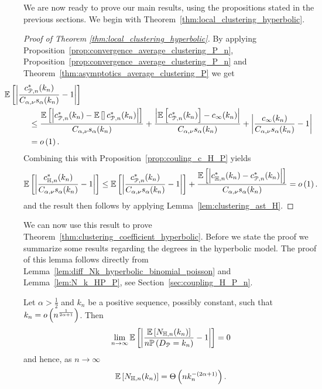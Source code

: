 We are now ready to prove our main results, using the propositions stated in the previous sections. We begin with Theorem~\ref{thm:local_clustering_hyperbolic}.

\begin{proof}[Proof of Theorem \ref{thm:local_clustering_hyperbolic}]
By applying Proposition~\ref{prop:convergence_average_clustering_P_n}, Proposition~\ref{prop:convergence_average_clustering_P_n} and Theorem~\ref{thm:asymptotics_average_clustering_P} we get
\begin{align*}
	&\hspace{-30pt}\Exp{\left|\frac{c_{\Pcal,n}^\ast(k_n)}{C_{\alpha,\nu}s_\alpha(k_n)} - 1\right|}\\
	&\le \frac{\Exp{\left|c_{\Pcal,n}^\ast(k_n) - \Exp{}c_{\Pcal,n}^\ast(k_n)\right|}}{C_{\alpha,\nu}s_\alpha(k_n)}
		+ \frac{\left|\Exp{c_{\Pcal,n}^\ast(k_n)} - c_\infty(k_n)\right|}{C_{\alpha,\nu}s_\alpha(k_n)}
		+ \left|\frac{c_{\infty}(k_n)}{C_{\alpha,\nu}s_\alpha(k_n)} - 1\right| \\
	&= \smallO{1}.
\end{align*}
Combining this with Proposition~\ref{prop:couling_c_H_P} yields
\[
	\mathbb{E}\left[\left|\frac{c_{\mathbb{H},n}^\ast(k_n)}{C_{\alpha,\nu}s_\alpha(k_n)} - 1\right|\right]
	\le \mathbb{E}\left[\left|\frac{c_{{\mathcal P},n}^\ast(k_n)}{C_{\alpha,\nu}s_\alpha(k_n)} - 1\right|\right] 
	+ \frac{\mathbb{E}\left[\left|c_{\mathbb{H},n}^\ast(k_n) - c_{{\mathcal P},n}^\ast(k_n)\right|\right]}{C_{\alpha,\nu}s_\alpha(k_n)} = o\left(1\right).
\]
and the result then follows by applying Lemma~\ref{lem:clustering_ast_H}. 
\end{proof}

We can now use this result to prove Theorem~\ref{thm:clustering_coefficient_hyperbolic}. Before we state the proof we summarize some results regarding the degrees in the hyperbolic model. The proof of this lemma follows directly from Lemma~\ref{lem:diff_Nk_hyperbolic_binomial_poisson} and Lemma~\ref{lem:N_k_HP_P}, see Section~\ref{sec:coupling_H_P_n}.

\begin{lemma}\label{lem:N_k_H_P}
Let $\alpha > \frac{1}{2}$ and $k_n$ be a positive sequence, possibly constant, such that $k_n = o\left(n^{\frac{1}{2\alpha + 1}}\right)$. Then
\[
	\lim_{n\to \infty} \mathbb{E}\left[\left|\frac{\mathbb{E}\left[N_{\mathbb{H},n}(k_n)\right]}{n \mathbb{P}\left(D_{{\mathcal P}} = k_n\right)} - 1\right|\right] = 0
\]
and hence, as $n \to \infty$
\[
	\mathbb{E}\left[N_{\mathbb{H},n}(k_n)\right] = \Theta\left(n k_n^{-(2\alpha + 1)}\right).
\]
\end{lemma}

